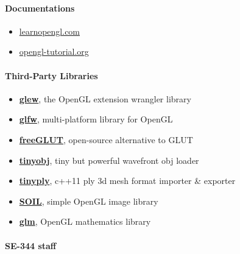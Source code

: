 \documentclass[
]{article}
\begin{document}
\hypertarget{header-n756}{%
\paragraph{Documentations}\label{header-n756}}

\begin{itemize}
\item
  \href{https://learnopengl.com}{learnopengl.com}
\item
  \href{http://www.opengl-tutorial.org}{opengl-tutorial.org}
\end{itemize}

\hypertarget{header-n775}{%
\paragraph{Third-Party Libraries}\label{header-n775}}

\begin{itemize}
\item
  \href{http://glew.sourceforge.net}{\textbf{glew}}, the OpenGL
  extension wrangler library
\item
  \href{https://www.glfw.org}{\textbf{glfw}}, multi-platform library for
  OpenGL
\item
  \href{http://freeglut.sourceforge.net}{\textbf{freeGLUT}}, open-source
  alternative to GLUT
\item
  \href{https://github.com/syoyo/tinyobjloader/}{\textbf{tinyobj}}, tiny
  but powerful wavefront obj loader
\item
  \href{https://github.com/ddiakopoulos/tinyply}{\textbf{tinyply}},
  c++11 ply 3d mesh format importer \& exporter
\item
  \href{https://github.com/paralin/soil}{\textbf{SOIL}}, simple OpenGL
  image library
\item
  \href{https://glm.g-truc.net}{\textbf{glm}}, OpenGL mathematics
  library 
\end{itemize}

\hypertarget{header-n816}{%
\paragraph{SE-344 staff}\label{header-n816}}
\end{document}
